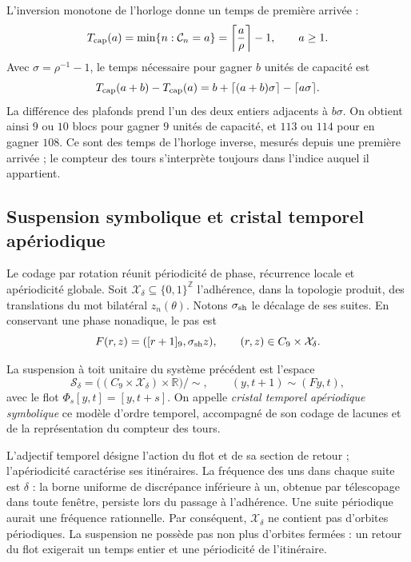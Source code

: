 L'inversion monotone de l'horloge donne un temps de première arrivée :
\[
 T_{\rm cap}(a)=\min\{n:\mathcal C_n=a\}
 =\left\lceil\frac a\rho\right\rceil-1,
 \qquad a\geq1.
\]
Avec \(\sigma=\rho^{-1}-1\), le temps nécessaire pour gagner \(b\) unités
de capacité est
\[
 T_{\rm cap}(a+b)-T_{\rm cap}(a)
 =b+\lceil(a+b)\sigma\rceil-\lceil a\sigma\rceil.
\]
La différence des plafonds prend l'un des deux entiers adjacents à
\(b\sigma\). On obtient ainsi \(9\) ou \(10\) blocs pour gagner
\(9\) unités de capacité, et \(113\) ou \(114\) pour en gagner \(108\).
Ce sont des temps de l'horloge inverse, mesurés depuis une première arrivée ; le
compteur des tours s'interprète toujours dans l'indice auquel il appartient.

\subsection{Suspension symbolique et cristal temporel apériodique}
\label{mono-ampl:cristal}

Le codage par rotation réunit périodicité de phase, récurrence locale
et apériodicité globale. Soit \(\mathcal X_\delta\subseteq\{0,1\}^{\mathbb Z}\)
l'adhérence, dans la topologie produit, des translations du mot
bilatéral \(z_n(\theta)\). Notons \(\sigma_{\rm sh}\) le
décalage de ses suites. En conservant une phase nonadique, le pas est
\[
 F(r,z)=([r+1]_9,\sigma_{\rm sh}z),\qquad
 (r,z)\in C_9\times\mathcal X_\delta.
\]

\begin{definition}
\label{mono-ampl:def-cristal}
La suspension à toit unitaire du système précédent est l'espace
\[
 \mathcal S_\delta=
 \bigl((C_9\times\mathcal X_\delta)\times\mathbb R\bigr)/\sim,
 \qquad (y,t+1)\sim(Fy,t),
\]
avec le flot \(\Phi_s[y,t]=[y,t+s]\). On appelle \emph{cristal temporel
apériodique symbolique} ce modèle d'ordre temporel, accompagné de son
codage de lacunes et de la représentation du compteur des tours.
\end{definition}

L'adjectif temporel désigne l'action du flot et de sa section de retour ;
l'apériodicité caractérise ses itinéraires. La fréquence des uns dans chaque
suite est \(\delta\) : la borne uniforme de discrépance inférieure à un,
obtenue par télescopage dans toute fenêtre, persiste lors du passage à l'adhérence.
Une suite périodique aurait une fréquence rationnelle. Par conséquent,
\(\mathcal X_\delta\) ne contient pas d'orbites périodiques. La suspension
ne possède pas non plus d'orbites fermées : un retour du flot exigerait un temps
entier et une périodicité de l'itinéraire.

